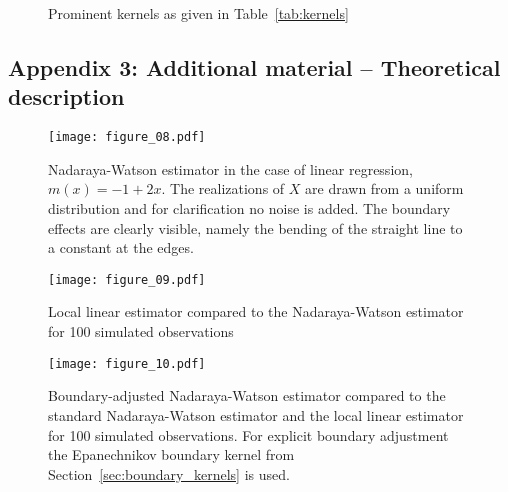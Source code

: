 \vfill
\begin{figure}[h]
	\centering	
	\caption{Prominent kernels as given in Table~\ref{tab:kernels}}
\end{figure}

\newpage

\subsection*{Appendix 3: Additional material -- Theoretical description}
\vfill
\begin{figure}[h]
	\centering
	\texttt{[image: figure\_08.pdf]}
	\caption{Nadaraya-Watson estimator in the case of linear regression, $m(x) = -1 + 2x$.
			 The realizations of $X$ are drawn from a uniform distribution and for clarification no noise is added.
		 	 The boundary effects are clearly visible, namely the bending of the straight line to a constant at the edges.}
	\label{fig:boundary_effects_linear}
\end{figure}
\vfill
\begin{figure}[h]
	\centering
	\texttt{[image: figure\_09.pdf]}
	\caption{Local linear estimator compared to the Nadaraya-Watson estimator for 100 simulated observations}
	\label{fig:ll}
\end{figure}
\vfill
\begin{figure}
	\centering
	\texttt{[image: figure\_10.pdf]}
	\caption{Boundary-adjusted Nadaraya-Watson estimator compared to the standard Nadaraya-Watson estimator and the local linear estimator for 100 simulated observations.
			 For explicit boundary adjustment the Epanechnikov boundary kernel from Section~\ref{sec:boundary_kernels} is used.}
	\label{fig:nw_boundary_adjusted}
\end{figure}

